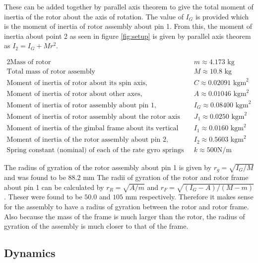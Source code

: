 \documentclass[8pt]{article}
\begin{document}
These can be added together by parallel axis theorem to give the total moment of inertia of the rotor about the axis of rotation.
The value of $I_G$ is provided which is the moment of inertia of rotor assembly about pin 1.
From this, the moment of inertia about point 2 as seen in figure \ref{fig:setup} is given by parallel axis theorem as $I_2 = I_G + Mr^2$.

\begin{alignat}{2}
    \text{Mass of rotor} \;\;\;\; & m \approx 4.173 \text{ kg} \nonumber\\
    \text{Total mass of rotor assembly} \;\;\;\; & M \approx 10.8 \text{ kg} \nonumber\\
    \text{Moment of inertia of rotor about its spin axis,} \;\;\;\; &  C \approx 0.02091 \text{ kgm}^2 \nonumber \\
    \text{Moment of inertia of rotor about other axes,} \;\;\;\; &  A \approx 0.01046 \text{ kgm}^2 \nonumber \\
    \text{Moment of inertia of rotor assembly about pin 1,} \;\;\;\; & I_G \approx 0.08400 \text{ kgm}^2 \nonumber \\
    \text{Moment of inertia of rotor assembly about the rotor axis (excluding rotor)} \;\;\;\; &  J_1 \approx 0.0250 \text{ kgm}^2 \nonumber \\
    \text{Moment of inertia of the gimbal frame about its vertical axis of rotation,} \;\;\;\; &  I_1 \approx 0.0160 \text{ kgm}^2 \nonumber \\
    \text{Moment of inertia of the rotor assembly about pin 2,} \;\;\;\; &  I_2 \approx 0.5603 \text{ kgm}^2 \nonumber \\
    \text{Spring constant (nominal) of each of the rate gyro springs} \;\;\;\; & k \approx 500 \text{N/m} \nonumber
\end{alignat}

The radius of gyration of the rotor assembly about pin 1 is given by $r_g = \sqrt{I_G/M}$ and was found to be $88.2$ mm
The radii of gyration of the rotor and rotor frame about pin 1 can be calculated by $r_R = \sqrt{A/m}$ and $r_F = \sqrt{(I_G - A)/(M-m)}$.
Theser were found to be $50.0$ and $105$ mm respectively.
Therefore it makes sense for the assembly to have a radius of gyration between the rotor and rotor frame.
Also because the mass of the frame is much larger than the rotor, the radius of gyration of the assembly is much closer to that of the frame.

\subsection{Dynamics}
\end{document}
